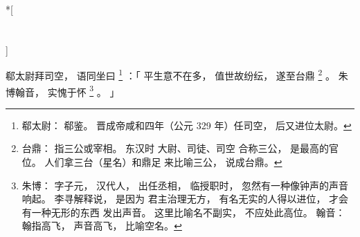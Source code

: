 
\switchcolumn[0]*[\section{}]

郗太尉拜司空，
语同坐曰%
\footnote{%
    郗太尉：
        郗鉴。
        晋成帝咸和四年（公元 329 年）任司空，
        后又进位太尉。
}%
：「
    平生意不在多，
    值世故纷纭，
    遂至台鼎%
    \footnote{%
        台鼎：
            指三公或宰相。
            东汉时
            大尉、司徒、司空
            合称三公，
            是最高的官位。
            人们拿三台（星名）和鼎足
            来比喻三公，
            说成台鼎。
    }%
    。
    朱博翰音，
    实愧于怀%
    \footnote{%
        朱博：
            字子元，
            汉代人，
            出任丞相，
            临授职时，
            忽然有一种像钟声的声音响起。
            李寻解释说，
            是因为
            君主治理无方，
            有名无实的人得以进位，
            才会有一种无形的东西
            发出声音。
            这里比喻名不副实，
            不应处此高位。
        翰音：
            翰指高飞，
            声音高飞，
            比喻空名。
    }%
    。
」

\switchcolumn



